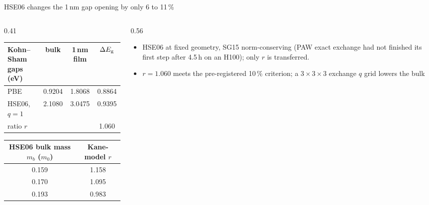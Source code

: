 \begin{frame}{HSE06 changes the 1\,nm gap opening by only 6 to 11\,\%}
  \sixdense\sixTop
  \begin{columns}[T,onlytextwidth]
    \begin{column}{0.41\textwidth}
      \begingroup\scriptsize
      \renewcommand{\arraystretch}{1.12}
      \setlength{\tabcolsep}{3.5pt}
      \begin{tabular}{@{}l c c c@{}}
        \toprule
        Kohn--Sham gaps (eV) & bulk & 1\,nm film & $\Delta E_{\mathrm{g}}$ \\
        \midrule
        PBE & 0.9204 & 1.8068 & 0.8864 \\
        HSE06, $q = 1$ & 2.1080 & 3.0475 & 0.9395 \\
        \midrule
        ratio $r$ & & & 1.060 \\
        \bottomrule
      \end{tabular}\par\endgroup
      \vspace{2mm}
      \begingroup\scriptsize
      \renewcommand{\arraystretch}{1.12}
      \begin{tabular}{@{}c c@{}}
        \toprule
        HSE06 bulk mass $m_b$ ($m_0$) & Kane-model $r$ \\
        \midrule
        0.159 & 1.158 \\
        0.170 & 1.095 \\
        0.193 & 0.983 \\
        \bottomrule
      \end{tabular}\par\endgroup
    \end{column}
    \begin{column}{0.56\textwidth}
      \begin{itemize}
        \item HSE06 at fixed geometry, SG15 norm-conserving (PAW exact exchange had not
          finished its first step after 4.5\,h on an H100); only $r$ is transferred.
        \item $r = 1.060$ meets the pre-registered 10\,\% criterion; a $3\times3\times3$ exchange $q$ grid lowers the bulk

\end{itemize}
\end{column}
\end{columns}
\end{frame}

